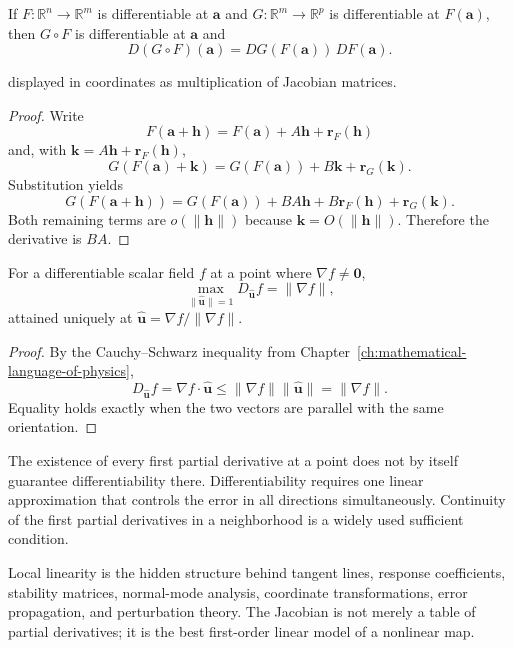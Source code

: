 \begin{bookproperty}
If $F:\mathbb R^n\to\mathbb R^m$ is differentiable at $\mathbf a$ and $G:\mathbb R^m\to\mathbb R^p$ is differentiable at $F(\mathbf a)$, then $G\circ F$ is differentiable at $\mathbf a$ and
\[
\boxed{D(G\circ F)(\mathbf a)=DG(F(\mathbf a))\,DF(\mathbf a).}
\]

displayed in coordinates as multiplication of Jacobian matrices.
\end{bookproperty}

\begin{proof}
Write
\[
F(\mathbf a+\mathbf h)=F(\mathbf a)+A\mathbf h+\mathbf r_F(\mathbf h)
\]
and, with $\mathbf k=A\mathbf h+\mathbf r_F(\mathbf h)$,
\[
G(F(\mathbf a)+\mathbf k)=G(F(\mathbf a))+B\mathbf k+\mathbf r_G(\mathbf k).
\]
Substitution yields
\[
G(F(\mathbf a+\mathbf h))=G(F(\mathbf a))+BA\mathbf h+B\mathbf r_F(\mathbf h)+\mathbf r_G(\mathbf k).
\]
Both remaining terms are $o(\lVert\mathbf h\rVert)$ because $\mathbf k=O(\lVert\mathbf h\rVert)$. Therefore the derivative is $BA$.
\end{proof}

\begin{bookproperty}
For a differentiable scalar field $f$ at a point where $\nabla f\neq\mathbf0$,
\[
\max_{\lVert\hat{\mathbf u}\rVert=1}D_{\hat{\mathbf u}}f=\lVert\nabla f\rVert,
\]
attained uniquely at $\hat{\mathbf u}=\nabla f/\lVert\nabla f\rVert$.
\end{bookproperty}

\begin{proof}
By the Cauchy--Schwarz inequality from Chapter~\ref{ch:mathematical-language-of-physics},
\[
D_{\hat{\mathbf u}}f=\nabla f\cdot\hat{\mathbf u}
\leq\lVert\nabla f\rVert\lVert\hat{\mathbf u}\rVert
=\lVert\nabla f\rVert.
\]
Equality holds exactly when the two vectors are parallel with the same orientation.
\end{proof}

\begin{mistakebox}
The existence of every first partial derivative at a point does not by itself guarantee differentiability there. Differentiability requires one linear approximation that controls the error in all directions simultaneously. Continuity of the first partial derivatives in a neighborhood is a widely used sufficient condition.
\end{mistakebox}

\begin{bookinsight}
Local linearity is the hidden structure behind tangent lines, response coefficients, stability matrices, normal-mode analysis, coordinate transformations, error propagation, and perturbation theory. The Jacobian is not merely a table of partial derivatives; it is the best first-order linear model of a nonlinear map.
\end{bookinsight}
